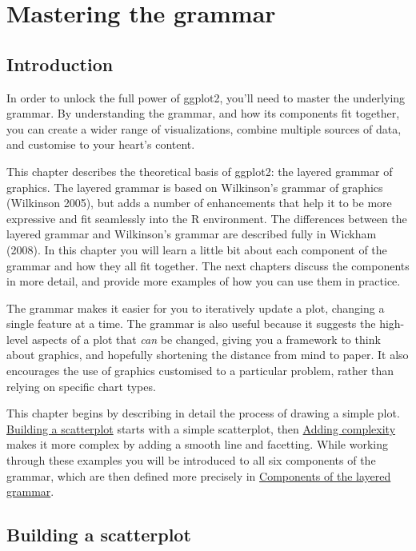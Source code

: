 \chapter{Mastering the grammar}\label{cha:mastery}

\section{Introduction}\label{introduction}

In order to unlock the full power of ggplot2, you'll need to master the
underlying grammar. By understanding the grammar, and how its components
fit together, you can create a wider range of visualizations, combine
multiple sources of data, and customise to your heart's content.

This chapter describes the theoretical basis of ggplot2: the layered
grammar of graphics. The layered grammar is based on Wilkinson's grammar
of graphics (Wilkinson 2005), but adds a number of enhancements that
help it to be more expressive and fit seamlessly into the R environment.
The differences between the layered grammar and Wilkinson's grammar are
described fully in Wickham (2008). In this chapter you will learn a
little bit about each component of the grammar and how they all fit
together. The next chapters discuss the components in more detail, and
provide more examples of how you can use them in practice.

The grammar makes it easier for you to iteratively update a plot,
changing a single feature at a time. The grammar is also useful because
it suggests the high-level aspects of a plot that \emph{can} be changed,
giving you a framework to think about graphics, and hopefully shortening
the distance from mind to paper. It also encourages the use of graphics
customised to a particular problem, rather than relying on specific
chart types.

This chapter begins by describing in detail the process of drawing a
simple plot. \protect\hyperlink{sec:simple-plot}{Building a scatterplot}
starts with a simple scatterplot, then
\protect\hyperlink{sec:complex-plot}{Adding complexity} makes it more
complex by adding a smooth line and facetting. While working through
these examples you will be introduced to all six components of the
grammar, which are then defined more precisely in
\protect\hyperlink{sec:components}{Components of the layered grammar}.

\hypertarget{sec:simple-plot}{\section{Building a
scatterplot}\label{sec:simple-plot}}

